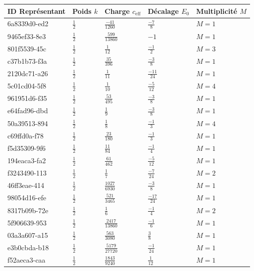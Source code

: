 \documentclass[11pt,twoside,openright]{book}
\begin{document}
\begin{longtable}{p{4.5cm}llll}
\toprule
\textbf{ID Représentant} & \textbf{Poids } $k$ & \textbf{Charge } $c_{\text{eff}}$ & \textbf{Décalage } $E_0$ & \textbf{Multiplicité } $M$ \\
\midrule
\endhead
6a8339d0-ed2 & $\frac{1}{2}$ & $\frac{-41}{1260}$ & $\frac{-7}{8}$ & $M=1$ \\
9465ef33-8e3 & $\frac{1}{2}$ & $\frac{599}{13860}$ & $-1$ & $M=1$ \\
801f5539-45c & $\frac{1}{2}$ & $\frac{1}{12}$ & $\frac{-1}{2}$ & $M=3$ \\
c37b1b73-f3a & $\frac{1}{2}$ & $\frac{35}{396}$ & $\frac{-3}{8}$ & $M=1$ \\
2120dc71-a26 & $\frac{1}{2}$ & $\frac{1}{11}$ & $\frac{-11}{24}$ & $M=1$ \\
5c01cd04-5f8 & $\frac{1}{2}$ & $\frac{1}{10}$ & $\frac{-5}{12}$ & $M=4$ \\
961951d6-f35 & $\frac{1}{2}$ & $\frac{53}{495}$ & $\frac{-3}{8}$ & $M=1$ \\
e64fad96-dbd & $\frac{1}{2}$ & $\frac{1}{9}$ & $\frac{-3}{8}$ & $M=1$ \\
50a39513-894 & $\frac{1}{2}$ & $\frac{1}{8}$ & $\frac{-1}{3}$ & $M=4$ \\
c69ffd0a-f78 & $\frac{1}{2}$ & $\frac{23}{180}$ & $\frac{-1}{3}$ & $M=1$ \\
f5d35309-9f6 & $\frac{1}{2}$ & $\frac{11}{84}$ & $\frac{-1}{4}$ & $M=1$ \\
194eaca3-fa2 & $\frac{1}{2}$ & $\frac{61}{462}$ & $\frac{-5}{12}$ & $M=1$ \\
f3243490-113 & $\frac{1}{2}$ & $\frac{1}{7}$ & $\frac{-7}{24}$ & $M=2$ \\
46ff3eae-414 & $\frac{1}{2}$ & $\frac{1027}{6930}$ & $\frac{-3}{8}$ & $M=1$ \\
98054d16-efe & $\frac{1}{2}$ & $\frac{521}{3465}$ & $\frac{-17}{24}$ & $M=1$ \\
8317b09b-72e & $\frac{1}{2}$ & $\frac{1}{6}$ & $\frac{-1}{4}$ & $M=2$ \\
5f906639-953 & $\frac{1}{2}$ & $\frac{2417}{13860}$ & $\frac{-1}{6}$ & $M=1$ \\
03a3a607-a15 & $\frac{1}{2}$ & $\frac{563}{3080}$ & $\frac{3}{8}$ & $M=1$ \\
e3b0cbda-b18 & $\frac{1}{2}$ & $\frac{5179}{27720}$ & $\frac{-1}{24}$ & $M=1$ \\
f52aeca3-caa & $\frac{1}{2}$ & $\frac{1843}{9240}$ & $\frac{1}{12}$ & $M=1$ \\

\end{longtable}
\end{document}
